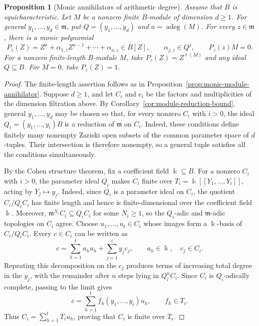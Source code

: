\documentclass[11pt,reqno]{amsart}
\numberwithin{equation}{section}
\newtheorem{proposition}[theorem]{Proposition}
\theoremstyle{definition}
\newcommand{\m}{\mathfrak m}
\newcommand{\adeg}{\operatorname{adeg}}
\begin{document}
\begin{proposition}[Monic annihilators of arithmetic degree]
\label{prop:equicharacteristic-annihilator}
Assume that $B$ is equicharacteristic. Let $M$ be a nonzero finite
$B$-module of dimension $d\ge1$. For general
$y_1,\ldots,y_d\in\m$, put $Q=(y_1,\ldots,y_d)$ and
$a=\adeg(M)$. For every $z\in\m$, there is a monic
polynomial
\[
 P_z(Z)=Z^a+\alpha_{1,z}Z^{a-1}+\cdots+\alpha_{a,z}\in B[Z],
 \qquad \alpha_{j,z}\in Q^j,
 \qquad P_z(z)M=0.
\]
For a nonzero finite-length $B$-module $M$, take
$P_z(Z)=Z^{\ell(M)}$ and any ideal $Q\subseteq B$.
For $M=0$, take $P_z(Z)=1$.
\end{proposition}
\begin{proof}
The finite-length assertion follows as in
Proposition~\ref{prop:monic-module-annihilator}.
Suppose $d\ge1$, and let $C_i$ and $e_i$ be the factors and
multiplicities of the dimension filtration above.
By Corollary~\ref{cor:module-reduction-bound}, general
$y_1,\ldots,y_d$ may be chosen so that, for every nonzero $C_i$
with $i>0$, the ideal $Q_i=(y_1,\ldots,y_i)B$ is a reduction
of $\m$ on $C_i$. Indeed, these conditions define finitely many
nonempty Zariski open subsets of the common parameter space of
$d$-tuples. Their intersection is therefore nonempty, so a general
tuple satisfies all the conditions simultaneously.

By the Cohen structure theorem, fix a coefficient field
$\Bbbk\subseteq B$. For a nonzero $C_i$ with $i>0$, the parameter
ideal $Q_i$ makes $C_i$ finite over
$T_i=\Bbbk[[Y_1,\ldots,Y_i]]$, acting by $Y_j\mapsto y_j$.
Indeed, since $Q_i$ is a parameter ideal on $C_i$, the quotient
$C_i/Q_iC_i$ has finite length and hence is finite-dimensional
over the coefficient field $\Bbbk$. Moreover,
$\m^{N_i}C_i\subseteq Q_iC_i$ for some $N_i\ge1$, so the
$Q_i$-adic and $\m$-adic topologies on $C_i$ agree. Choose
$u_1,\ldots,u_t\in C_i$ whose images form a $\Bbbk$-basis of
$C_i/Q_iC_i$. Every $c\in C_i$ can be written as
\[
 c=\sum_{h=1}^{t}a_hu_h+\sum_{j=1}^{i}y_jc_j,
 \qquad a_h\in\Bbbk,\quad c_j\in C_i.
\]
Repeating this decomposition on the $c_j$ produces terms of
increasing total degree in the $y_j$, with the remainder after
$n$ steps lying in $Q_i^nC_i$. Since $C_i$ is $Q_i$-adically complete,
passing to the limit gives
\[
 c=\sum_{h=1}^{t}f_h(y_1,\ldots,y_i)u_h,
 \qquad f_h\in T_i.
\]
Thus $C_i=\sum_{h=1}^{t}T_i u_h$, proving that $C_i$ is finite
over $T_i$.


\end{proof}
\end{document}
